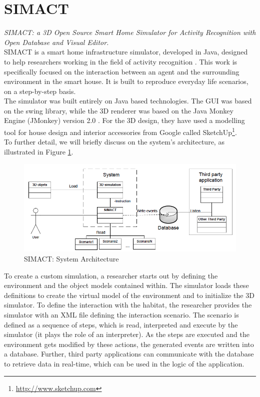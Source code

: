 \section{SIMACT}\label{sec:simact}
\emph{SIMACT: a 3D Open Source Smart Home Simulator for Activity Recognition with Open Database and Visual Editor.}\\

SIMACT is a smart home infrastructure simulator, developed in Java, designed to help researchers working in the field of activity recognition \cite{bouchard2012simact}. This work is specifically focused on the interaction between an agent and the surrounding environment in the smart house. It is built to reproduce everyday life scenarios, on a step-by-step basis.\\

The simulator was built entirely on Java based technologies. The GUI was based on the swing library, while the 3D renderer was based on the Java Monkey Engine (JMonkey) version 2.0 \cite{jme:online}. For the 3D design, they have used a modelling tool for house design and interior accessories from Google called SketchUp\footnote{\url{http://www.sketchup.com}}.\\

To further detail, we will briefly discuss on the system's architecture, as illustrated in Figure \ref{fig:simact_architecture}.

\begin{figure}[H]
	\centering
	\includegraphics[width=\linewidth]{gfx/Chapter2/simact_architecture}
	\caption{SIMACT: System Architecture}
	\label{fig:simact_architecture}
\end{figure}

To create a custom simulation, a researcher starts out by defining the environment and the object models contained within. The simulator loads these definitions to create the virtual model of the environment and to initialize the 3D simulator. To define the interaction with the habitat, the researcher provides the simulator with an XML file defining the interaction scenario. The scenario is defined as a sequence of steps, which is read, interpreted and execute by the simulator (it plays the role of an interpreter). As the steps are executed and the environment gets modified by these actions, the generated events are written into a database. Further, third party applications can communicate with the database to retrieve data in real-time, which can be used in the logic of the application.\\


